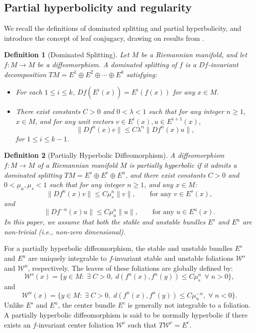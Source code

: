 \documentclass[11pt]{amsart}
\numberwithin{equation}{section}
\theoremstyle{plain}
\newtheorem{defi}{Definition}[section]
\begin{document}
\subsection{Partial hyperbolicity and regularity}\label{prel:ph}
We recall the definitions of dominated splitting and partial hyperbolicity, and introduce the concept of leaf conjugacy, drawing on results from \cite{HPS}.

\begin{defi}[Dominated Splitting]
Let $M$ be a Riemannian manifold, and let $f:M\to M$ be a diffeomorphism. A \emph{dominated splitting} of $f$ is a $Df$-invariant decomposition $TM=E^1\oplus E^2\oplus \cdots \oplus E^k$ satisfying:
\begin{itemize}
\item For each $1\le i\le k$, $Df(E^i(x))=E^i(f(x))$ for any $x\in M$.
\item There exist constants $C>0$ and $0 < \lambda < 1$ such that for any integer $n \ge 1$, $x\in M$, and for any unit vectors $v\in E^i(x), u\in E^{i+1}(x)$,
$$
\|Df^n(x)v\|\le C\lambda^n \|Df^n(x)u\|,
$$
for $1\le i\le k-1$.
\end{itemize}
\end{defi}

\begin{defi}[Partially Hyperbolic Diffeomorphism]\label{defi:ph}
A diffeomorphism $f:M\to M$ of a Riemannian manifold $M$ is \emph{partially hyperbolic} if it admits a \emph{dominated splitting} $TM=E^s\oplus E^c\oplus E^u$, and there exist constants $C>0$ and $0<\mu_u,\mu_s<1$ such that for any integer $n \ge 1$, and any $x\in M$:
$$
\|Df^n(x)v\|\le C\mu_s^n\|v\|,\qquad \text{for any } v\in E^s(x),
$$
and
$$
\|Df^{-n}(x)u\|\le C\mu_u^n\|u\|,\qquad \text{for any } u\in E^u(x).
$$
In this paper, we assume that both the stable and unstable bundles $E^s$ and $E^u$ are non-trivial (i.e., non-zero dimensional).
\end{defi}

For a partially hyperbolic diffeomorphism, the stable and unstable bundles $E^s$ and $E^u$ are uniquely integrable to $f$-invariant stable and unstable foliations $\mathcal{W}^s$ and $\mathcal{W}^u$, respectively. The leaves of these foliations are globally defined by:
$$
\mathcal{W}^s(x)=\{y\in M:\; \exists\; C>0,\; d(f^n(x),f^n(y))\le C\mu_s^n \,\; \forall\; n>0 \},
$$
and
$$
\mathcal{W}^u(x)=\{y\in M: \;\exists\; C>0, \;d(f^n(x),f^n(y))\le C\mu_u^{-n} , \;\forall\; n<0 \}.
$$
Unlike $E^s$ and $E^u$, the center bundle $E^c$ is generally not integrable to a foliation. A partially hyperbolic diffeomorphism is said to be normally hyperbolic if there exists an $f$-invariant center foliation $\mathcal{W}^c$ such that $T\mathcal{W}^c = E^c$.
\end{document}
